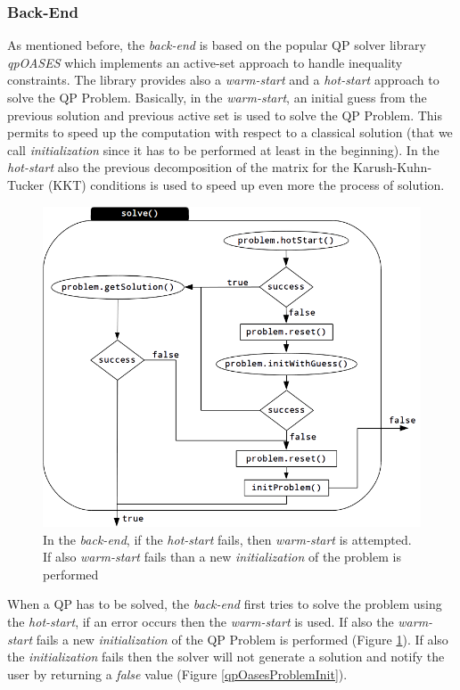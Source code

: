 \subsubsection{Back-End}
As mentioned before, the \emph{back-end} is based on the popular QP solver library \emph{qpOASES} \cite{Ferreau:14} which implements an active-set approach to handle inequality constraints. The library provides also a \emph{warm-start} and a \emph{hot-start} approach to solve the QP Problem. Basically, in the \emph{warm-start}, an initial guess from the previous solution and previous active set is used to solve the QP Problem. This permits to speed up the computation with respect to a classical solution (that we call \emph{initialization} since it has to be performed at least in the beginning).
In the \emph{hot-start} also the previous decomposition of the matrix for the Karush-Kuhn-Tucker (KKT) conditions is used to speed up even more the process of solution. 
\begin{figure}[htb] 
\vspace{2 mm}
\centering 
\includegraphics[width=\textwidth]{gfx/QPOasesProblem_solve2.png} 
\caption{In the \emph{back-end}, if the \emph{hot-start} fails, then \emph{warm-start} is attempted. If also \emph{warm-start} fails than a new \emph{initialization} of the problem is performed} 
\label{qpOasesProblemSolve}
\end{figure}

When a QP has to be solved, the \emph{back-end} first tries to solve the problem using the \emph{hot-start}, if an error occurs then the \emph{warm-start} is used. If also the \emph{warm-start} fails a new \emph{initialization} of the QP Problem is performed (Figure \ref{qpOasesProblemSolve}). If also the \emph{initialization} fails then the solver will not generate a solution and notify the user by returning a \emph{false} value (Figure \ref{qpOasesProblemInit}).

